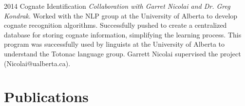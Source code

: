 \documentclass[a4paper]{cv-friggeri}
\begin{document}
\begin{entrylist}

\entry
{2014}
{Cognate Identification}
{}
{\emph{Collaboration with Garret Nicolai and Dr. Greg Kondrak}. Worked with the NLP group at the University of Alberta to develop cognate recognition algorithms. Successfully pushed to create a centralized database for storing cognate information, simplifying the learning process. This program was successfully used by linguists at the University of Alberta to understand the Totonac language group. Garrett Nicolai supervised the project (Nicolai@ualberta.ca).}

\end{entrylist}


\section{Publications}

\cite{largesetsroughpatterns}
\cite{notesfromthemargin}






\end{document}
